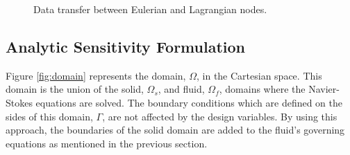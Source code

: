 \documentclass[12pt]{aiaa-pretty}
\begin{document}
%
\begin{figure}[H]
	\centering
	\quad
	\quad
	\caption{Data transfer between Eulerian and Lagrangian nodes.}
	\label{fig:mappingDataE2L}
\end{figure}
%

\subsection{Analytic Sensitivity Formulation}
Figure \ref{fig:domain} represents the domain, $\Omega$, in the Cartesian space. This domain is the union of the solid, $\Omega_s$, and fluid, $\Omega_f$, domains where the Navier-Stokes equations are solved. The boundary conditions which are defined on the sides of this domain, $\Gamma$, are not affected by the design variables. By using this approach, the boundaries of the solid domain are added to the fluid's governing equations as mentioned in the previous section.
\end{document}
